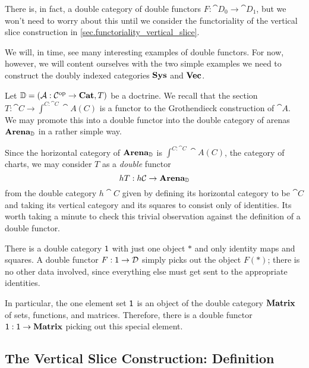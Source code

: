 \documentclass[DynamicalBook]{subfiles}
\begin{document}
\begin{remark}
There is, in fact, a double category of double functors $F : \cat{D}_0 \to
\cat{D}_1$, but we won't need to worry about this until we consider the
functoriality of the vertical slice construction in \cref{sec.functoriality_vertical_slice}.
\end{remark}

We will, in time, see many interesting examples of double functors. For now,
however, we will content ourselves with the two simple examples we need to
construct the doubly indexed categories $\textbf{Sys}$ and $\textbf{Vec}$.

\begin{example}\label{ex.double_functor_section}
Let $\mathbb{D} = (\mathcal{A} : \mathcal{C}^{\textnormal{op}} \to \textbf{Cat}, T)$ be a doctrine. We
recall that the section $T : \cat{C} \to \int^{C : \cat{C}}\cat{A}(C)$ is a functor to the
Grothendieck construction of $\cat{A}$. We may promote this into a double
functor into the double category of arenas $\textbf{Arena}_{\mathbb{D}}$ in a
rather simple way.

Since the horizontal category of $\textbf{Arena}_{\mathbb{D}}$ is $\int^{C : \cat{C}}
\cat{A}(C)$, the category of charts, we may consider $T$ as a \emph{double}
functor
$$hT : h\mathcal{C} \to \textbf{Arena}_{\mathbb{D}}$$
from the double category $h\cat{C}$ given by defining its horizontal category to
be $\cat{C}$ and taking its vertical category and its squares to consist only of
identities. Its worth taking a minute to check this trivial observation against
the definition of a double functor.
\end{example}

\begin{example}\label{ex.double_functor_one}
There is a double category $\mathsf{1}$ with just one object $\ast$ and only identity maps
and squares. A double functor $F : \mathsf{1} \to \mathcal{D}$ simply picks out the
object $F(\ast)$; there is no other data involved, since everything else must
get sent to the appropriate identities.

In particular, the one element set $\mathsf{1}$ is an object of the double category
$\textbf{Matrix}$ of sets, functions, and matrices. Therefore, there is a double
functor $\mathsf{1} : \mathsf{1} \to \textbf{Matrix}$ picking out this special element.
\end{example}


\subsection{The Vertical Slice Construction: Definition}
\end{document}
